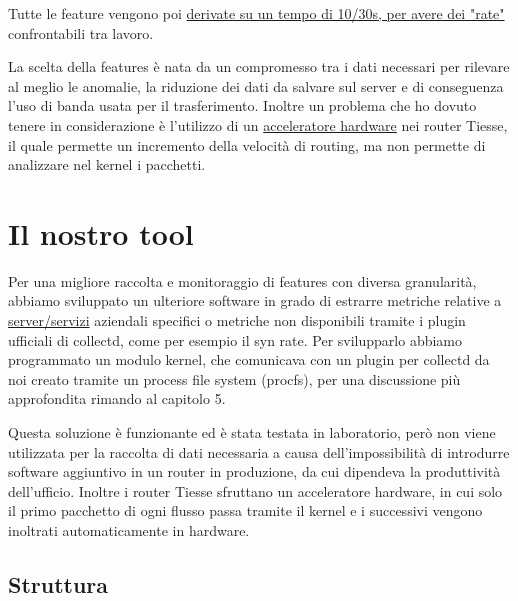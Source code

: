 Tutte le feature vengono poi \uline{derivate su un tempo di 10/30s, per avere dei "rate"} confrontabili tra lavoro.

La scelta della features è nata da un compromesso tra i dati necessari per rilevare al meglio le anomalie, la riduzione dei dati da salvare sul server e di conseguenza l'uso di banda usata per il trasferimento. Inoltre un problema che ho dovuto tenere in considerazione è l'utilizzo di un \underline{acceleratore hardware} nei router Tiesse, il quale permette un incremento della velocità di routing, ma non permette di analizzare nel kernel i pacchetti.
 
\section{Il nostro tool}

Per una migliore raccolta e monitoraggio di features con diversa granularità, abbiamo sviluppato un ulteriore software in grado di estrarre metriche relative a \uline{server/servizi} aziendali specifici o metriche non disponibili tramite i plugin ufficiali di collectd, come per esempio il syn rate. Per svilupparlo abbiamo programmato un modulo kernel, che comunicava con un plugin per collectd da noi creato tramite un process file system (procfs), per una discussione più approfondita rimando al capitolo 5.

Questa soluzione è funzionante ed è stata testata in laboratorio, però non viene utilizzata per la raccolta di dati necessaria a causa dell'impossibilità di introdurre software aggiuntivo in un router in produzione, da cui dipendeva la produttività dell'ufficio. Inoltre i router Tiesse sfruttano un acceleratore hardware, in cui solo il primo pacchetto di ogni flusso passa tramite il kernel e i successivi vengono inoltrati automaticamente in hardware.


\subsection{Struttura}

